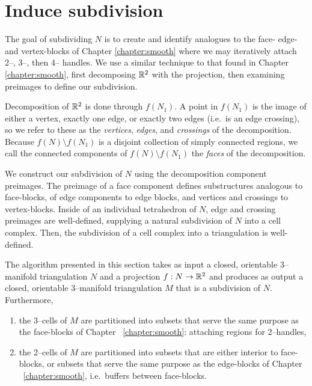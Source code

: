 \section{Induce subdivision}

The goal of subdividing $N$ is to create and identify analogues to the face- edge- and vertex-blocks of Chapter \ref{chapter:smooth} where we may iteratively attach 2--, 3--, then 4-- handles.
We use a similar technique to that found in Chapter \ref{chapter:smooth}, first decomposing $\mathbb{R}^2$ with the projection, then examining preimages to define our subdivision.

Decomposition of $\mathbb{R}^2$ is done through $f(N_1)$.
A point in $f(N_1)$ is the image of either a vertex, exactly one edge, or exactly two edges (i.e.\ is an edge crossing), so we refer to these as the \emph{vertices}, \emph{edges}, and \emph{crossings} of the decomposition.
Because $f(N)\setminus f(N_1)$  is a disjoint collection of simply connected regions, we call the connected components of $f(N)\setminus f(N_1)$ the \emph{faces} of the decomposition.

We construct our subdivision of $N$ using the decomposition component preimages.
The preimage of a face component defines substructures analogous to face-blocks, of edge components to edge blocks, and vertices and crossings to vertex-blocks.
Inside of an individual tetrahedron of $N$, edge and crossing preimages are well-defined, supplying a natural subdivision of $N$ into a cell complex.
Then, the subdivision of a cell complex into a triangulation is well-defined.

The algorithm presented in this section takes as input a closed, orientable 3--manifold triangulation $N$ and a projection $f:N\to\mathbb{R}^2$ and produces as output a closed, orientable 3--manifold triangulation $M$ that is a subdivision of $N$.
Furthermore,
\begin{enumerate}
	\item the 3--cells of $M$ are partitioned into subsets that serve the same purpose as the face-blocks of Chapter ~\ref{chapter:smooth}: attaching regions for 2--handles,
	\item the 2--cells of $M$ are partitioned into subsets that are either interior to face-blocks, or subsets that serve the same purpose as the edge-blocks of Chapter ~\ref{chapter:smooth}, i.e.\ buffers between face-blocks.	
\end{enumerate}

